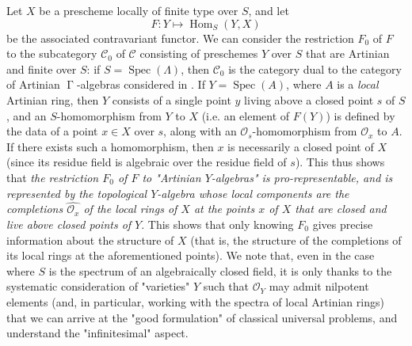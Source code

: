 Let $X$ be a prescheme locally of finite type over $S$, and let
\[
    F\colon Y \mapsto \operatorname{Hom}_S(Y,X)
\]
be the associated contravariant functor.
We can consider the restriction $F_0$ of $F$ to the subcategory $\mathcal{C}_0$ of $\mathcal{C}$ consisting of preschemes $Y$ over $S$ that are Artinian and finite over $S$:
if $S=\operatorname{Spec}(\Lambda)$, then $\mathcal{C}_0$ is the category dual to the category of Artinian $\operatorname{\Gamma}$-algebras considered in .
If $Y=\operatorname{Spec}(A)$, where $A$ is a \emph{local} Artinian ring, then $Y$ consists of a single point $y$ living above a closed point $s$ of $S$, and an $S$-homomorphism from $Y$ to $X$ (i.e. an element of $F(Y)$) is defined by the data of a point $x\in X$ over $s$, along with an $\mathcal{O}_s$-homomorphism from $\mathcal{O}_x$ to $A$.
If there exists such a homomorphism, then $x$ is necessarily a closed point of $X$ (since its residue field is algebraic over the residue field of $s$).
This thus shows that \emph{the restriction $F_0$ of $F$ to "Artinian $Y$-algebras" is pro-representable, and is represented by the topological $Y$-algebra whose local components are the completions $\widehat{\mathcal{O}_x}$ of the local rings of $X$ at the points $x$ of $X$ that are closed and live above closed points of $Y$}.
This shows that only knowing $F_0$ gives precise information about the structure of $X$ (that is, the structure of the completions of its local rings at the aforementioned points).
We note that, even in the case where $S$ is the spectrum of an algebraically closed field, it is only thanks to the systematic consideration of "varieties" $Y$ such that $\mathcal{O}_Y$ may admit nilpotent elements (and, in particular, working with the spectra of local Artinian rings) that we can arrive at the "good formulation" of classical universal problems, and understand the "infinitesimal" aspect.


